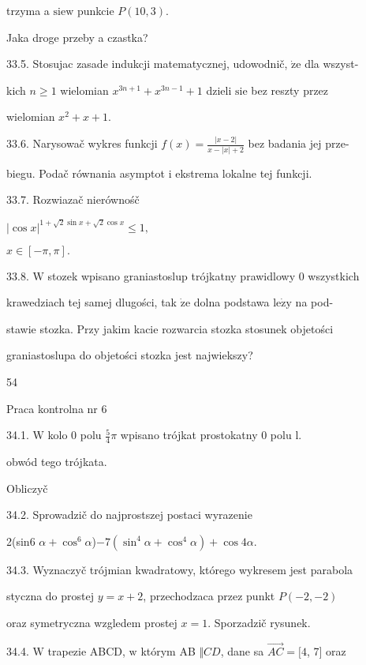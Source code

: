 \documentclass[a4paper,12pt]{article}
\begin{document}
trzyma a $\mathrm{s}\mathrm{i}\mathrm{e} \mathrm{w}$ punkcie $P(10,3).$

Jaka droge przeby a czastka?

33.5. Stosujac zasade indukcji matematycznej, udowodnič, $\dot{\mathrm{z}}\mathrm{e}$ dla wszyst-

kich $n \geq 1$ wielomian $x^{3n+1}+x^{3n-1}+1$ dzieli $\mathrm{s}\mathrm{i}\mathrm{e}$ bez reszty przez

wielomian $x^{2}+x+1.$

33.6. Narysowač wykres funkcji $f(x) = \displaystyle \frac{|x-2|}{x-|x|+2}$ bez badania jej prze-

biegu. Podač równania asymptot $\mathrm{i}$ ekstrema lokalne tej funkcji.

33.7. Rozwiazač nierównośč

$|\cos x|^{1+\sqrt{2}\sin x+\sqrt{2}\cos x}\leq 1,$

$x\in[-\pi,\pi].$

33.8. $\mathrm{W}$ stozek wpisano graniastoslup trójkatny prawidlowy $0$ wszystkich

krawedziach tej samej dlugości, tak $\dot{\mathrm{z}}\mathrm{e}$ dolna podstawa $\mathrm{l}\mathrm{e}\dot{\mathrm{z}}\mathrm{y}$ na pod-

stawie stozka. Przy jakim kacie rozwarcia stozka stosunek objetości

graniastoslupa do objetości stozka jest najwiekszy?





54

Praca kontrolna nr 6

34.1. $\mathrm{W}$ kolo $0$ polu $\displaystyle \frac{5}{4}\pi$ wpisano trójkat prostokatny $0$ polu l.

obwód tego trójkata.

Obliczyč

34.2. Sprowadzič do najprostszej postaci wyrazenie

2(sin6 $\alpha+\cos^{6}\alpha$)$-7(\sin^{4}\alpha+\cos^{4}\alpha)+\cos 4\alpha.$

34.3. Wyznaczyč trójmian kwadratowy, którego wykresem jest parabola

styczna do prostej $y=x+2$, przechodzaca przez punkt $P(-2,-2)$

oraz symetryczna wzgledem prostej $x=1$. Sporzadzič rysunek.

34.4. $\mathrm{W}$ trapezie ABCD, $\mathrm{w}$ którym AB $\Vert CD$, dane sa $\vec{AC}= [4$, 7$]$ oraz
\end{document}
